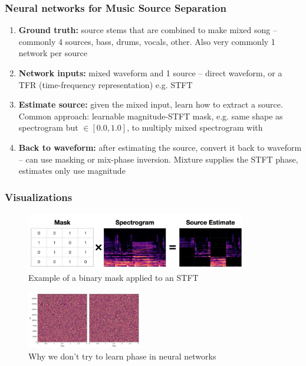\documentclass[usenames,dvipsnames]{beamer}
\begin{document}
\begin{frame}[fragile]
	\frametitle{Neural networks for Music Source Separation}
	\begin{enumerate}
		\item
			\textbf{Ground truth:} source stems that are combined to make mixed song -- commonly 4 sources, bass, drums, vocals, other. Also very commonly 1 network per source
		\item
			\textbf{Network inputs:} mixed waveform and 1 source -- direct waveform, or a TFR (time-frequency representation)  e.g. STFT
		\item
			\textbf{Estimate source:} given the mixed input, learn how to extract a source. Common approach: learnable magnitude-STFT mask, e.g. same shape as spectrogram but $\in [0.0, 1.0]$, to multiply mixed spectrogram with
		\item
			\textbf{Back to waveform:} after estimating the source, convert it back to waveform -- can use masking or mix-phase inversion. Mixture supplies the STFT phase, estimates only use magnitude
	\end{enumerate}
\end{frame}

\begin{frame}
	\frametitle{Visualizations}
	\begin{figure}[ht]
		\includegraphics[height=2.5cm]{./mask_simple.png}
		\caption{Example of a binary mask applied to an STFT}
	\end{figure}
	\begin{figure}[ht]
		\includegraphics[height=2.5cm]{./whynophase.png}
		\caption{Why we don't try to learn phase in neural networks}
	\end{figure}
\end{frame}
\end{document}
